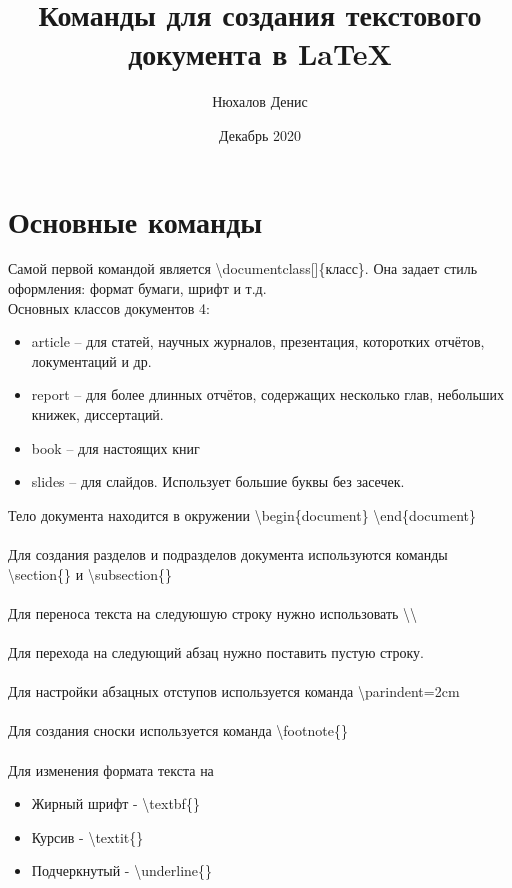 \documentclass[a4paper,12pt]{article} %
\author{Нюхалов Денис}
\title{Команды для создания текстового документа в \LaTeX{}}
\date{Декабрь 2020}
\begin{document}

\maketitle
\newpage

\section{Основные команды}

Самой первой командой является \textbackslash documentclass[]\{класс\}. Она задает стиль оформления: формат бумаги, шрифт и т.д.\\
Основных классов документов 4:
\begin{itemize}
        \item article -- для статей, научных журналов, презентация, которотких отчётов, локументаций и др.
        \item report -- для более длинных отчётов, содержащих несколько глав, небольших книжек, диссертаций.
        \item book -- для настоящих книг
        \item slides -- для слайдов. Использует большие буквы без засечек.
\end{itemize}
Тело документа находится в окружении \textbackslash begin\{document\} \textbackslash end\{document\}\\\\
Для создания разделов и подразделов документа используются команды \textbackslash section\{\} и \textbackslash subsection\{\}\\\\
Для переноса текста на следуюшую строку нужно использовать \textbackslash\textbackslash\\\\
Для перехода на следующий абзац нужно поставить пустую строку.\\\\
Для настройки абзацных отступов используется команда \textbackslash parindent=2cm\\\\
Для создания сноски используется команда \textbackslash footnote\{\}\\\\
Для изменения формата текста на 
\begin{itemize}
    \item Жирный шрифт - \textbackslash textbf\{\}
    \item Курсив - \textbackslash textit\{\}
    \item Подчеркнутый - \textbackslash underline\{\}
\end{itemize}
\end{document}
